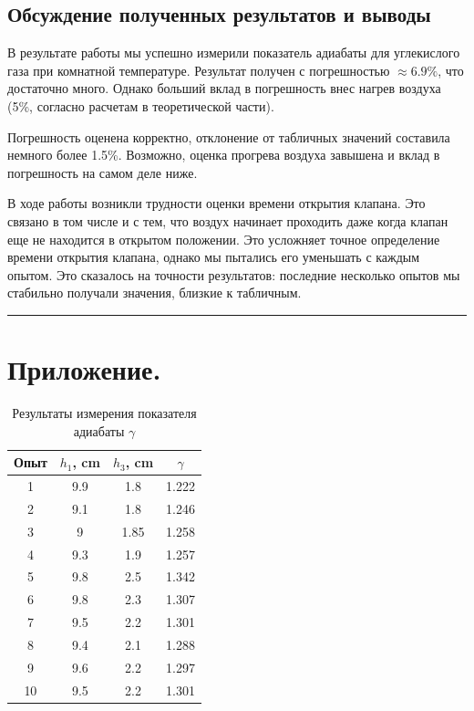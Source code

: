 \documentclass[a4paper,12pt]{report}
\begin{document}
    \begin{multicols}{2}
    \section{Обсуждение полученных результатов и выводы}
    
    В результате работы мы успешно измерили показатель адиабаты для углекислого газа при комнатной температуре. Результат получен с погрешностью $\approx 6.9\%$, что достаточно много. Однако больший вклад в погрешность внес нагрев воздуха (5\%, согласно расчетам в теоретической части).

    Погрешность оценена корректно, отклонение от табличных значений составила немного более 1.5\%. Возможно, оценка прогрева воздуха завышена и вклад в погрешность на самом деле ниже.

    В ходе работы возникли трудности оценки времени открытия клапана. Это связано в том числе и с тем, что воздух начинает проходить даже когда клапан еще не находится в открытом положении. Это усложняет точное определение времени открытия клапана, однако мы пытались его уменьшать с каждым опытом. Это сказалось на точности результатов: последние несколько опытов мы стабильно получали значения, близкие к табличным.
    \end{multicols}
    \vspace{2mm}
    \hrule
    \section{Приложение.}
    \begin{table}[H]
        \centering
        \begin{tabular}{|c|c|c|c|}
            \hline
            Опыт & $h_1$, cm & $h_3$, cm & $\gamma$ \\
            \hline
            1 & 9.9 & 1.8 & 1.222 \\
            \hline
            2 & 9.1 & 1.8 & 1.246 \\
            \hline
            3 & 9 & 1.85 & 1.258 \\
            \hline
            4 & 9.3 & 1.9 & 1.257 \\
            \hline
            5 & 9.8 & 2.5 & 1.342 \\
            \hline
            6 & 9.8 & 2.3 & 1.307 \\
            \hline
            7 & 9.5 & 2.2 & 1.301 \\
            \hline
            8 & 9.4 & 2.1 & 1.288 \\
            \hline
            9 & 9.6 & 2.2 & 1.297 \\
            \hline
            10 & 9.5 & 2.2 & 1.301 \\
            \hline
        \end{tabular}
        \caption{Результаты измерения показателя адиабаты $\gamma$}
    \end{table}
\end{document}
